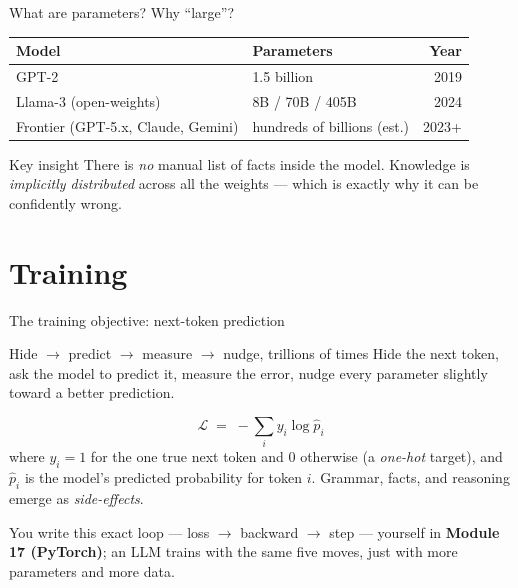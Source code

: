 \documentclass[aspectratio=169,11pt]{beamer}
\begin{document}
\begin{frame}{What are parameters? Why ``large''?}
  \small
  \begin{center}
  \begin{tabular}{llr}
    \toprule
    \textbf{Model} & \textbf{Parameters} & \textbf{Year} \\
    \midrule
    GPT-2                              & 1.5 billion                  & 2019 \\
    Llama-3 (open-weights)             & 8B / 70B / 405B              & 2024 \\
    Frontier (GPT-5.x, Claude, Gemini) & hundreds of billions (est.)  & 2023+ \\
    \bottomrule
  \end{tabular}
  \end{center}
  \begin{alertblock}{Key insight}
    There is \emph{no} manual list of facts inside the model. Knowledge is \emph{implicitly distributed} across all the weights --- which is exactly why it can be confidently wrong.
  \end{alertblock}
\end{frame}

\section{Training}
\begin{frame}{The training objective: next-token prediction}
  \begin{block}{Hide $\to$ predict $\to$ measure $\to$ nudge, trillions of times}
    Hide the next token, ask the model to predict it, measure the error, nudge every parameter slightly toward a better prediction.
  \end{block}
  \[
    \mathcal{L} \;=\; -\sum_i y_i \log \hat{p}_i
  \]
  where $y_i = 1$ for the one true next token and $0$ otherwise (a \emph{one-hot} target), and $\hat{p}_i$ is the model's predicted probability for token $i$. Grammar, facts, and reasoning emerge as \emph{side-effects}.

  \vspace{2pt}
  {\footnotesize You write this exact loop --- loss $\to$ backward $\to$ step --- yourself in \textbf{Module 17 (PyTorch)}; an LLM trains with the same five moves, just with more parameters and more data.}
\end{frame}
\end{document}
